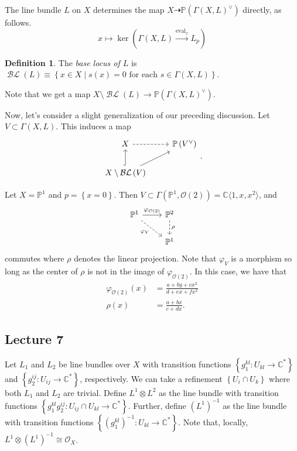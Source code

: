 \documentclass[10pt,letterpaper,cm]{nupset}
\theoremstyle{definition}
\newtheorem{defn}{Definition}[subsection]
\theoremstyle{theorem}
\theoremstyle{remark}
\newcommand{\C}{\mathbb C}
\renewcommand{\O}{\mathcal O}
\renewcommand{\P}{\mathbb P}
\newcommand{\1}{\mathbb{1}}
\newcommand{\0}{\vec 0}
\DeclareMathOperator{\ev}{eval}
\DeclareMathOperator{\BL}{\mathcal{BL}}
\begin{document}
The line bundle $L$ on $X$ determines the map $X \dashrightarrow \P\left(\Gamma\left(X, L\right)^{\vee}\right)$ directly, as follows.
\[
x\mapsto \ker\left(\Gamma\left(X, L\right) \overset{\ev_x}{\longrightarrow} L_p\right)
\]

\begin{defn}
The \textit{base locus of $L$} is $\BL\left(L\right) \equiv \left\{x  \in X \mid s(x) =0 \text{ for each } s\in \Gamma\left(X, L\right)\right\}$.
\end{defn} 

Note that we get a map $X \setminus \BL\left(L\right) \to \P\left(\Gamma\left(X, L\right)^{\vee}\right)$.

\bigskip

Now, let's consider a slight generalization of our preceding discussion. Let $V \subset \Gamma\left(X, L\right)$. This induces a map 
\[
\begin{tikzcd}
X \arrow[r, dashed]                                    & \P\left(V^{\vee}\right) \\
X\setminus\BL\left(V\right) \arrow[u, hook] \arrow[ru] &                        
\end{tikzcd}.
\]

Let $X = \P^1$ and $p = \left\{x=0\right\}$. Then $V \subset \Gamma\left(\P^1, \O(2)\right) = \C\langle 1, x, x^2\rangle$, and
\[
\begin{tikzcd}
\P^1 \arrow[rd, "\varphi_V"', dashed] \arrow[r, "\varphi_{\O(2)}"] & \P^2 \arrow[d, "\rho", dashed] \\
                                                                   & \P^1                       
\end{tikzcd}
\] commutes where $\rho$ denotes the linear projection. Note that $\varphi_V$ is a morphism so long as the center of $\rho$ is not in the image of $\varphi_{\O(2)}$. In this case, we have that
\begin{align*}
\varphi_{\O(2)}(x) & = \frac{a +by + cx^2}{d + ex +fx^2}
\\  \rho(x) & = \frac{a+bx}{c+dx}.
\end{align*}

\subsection{Lecture 7}

Let $L_1$ and $L_2 $ be line bundles over $X$ with transition functions $\left\{g_1^{k{l}} : U_{k{l}} \to \C^{\ast}\right\}$ and $\left\{g_2^{i{j}} : U_{i{j}} \to \C^{\ast}\right\}$, respectively. We can take a refinement $\left\{U_{i} \cap U_k\right\}$ where both $L_1$ and $L_2$ are trivial.  Define $L^1 \otimes L^2$ as the line bundle with transition functions $\left\{g_1^{k{l}}g_2^{i{j}} : U_{ij} \cap U_{k{l}} \to \C^{\ast}\right\}$. Further, define $\left(L^1\right)^{-1}$ as the line bundle with transition functions $\left\{\left(g_1^{k{l}}\right)^{-1} : U_{k{l}} \to \C^{\ast}\right\}$. Note that, locally, $L^1 \otimes \left(L^1\right)^{-1} \cong \O_X$.
\end{document}
